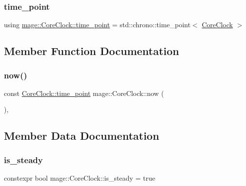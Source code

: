 \subsubsection{\texorpdfstring{time\+\_\+point}{time\_point}}
{\footnotesize\ttfamily using \hyperlink{structmage_1_1_core_clock_a1ea0193dea9647827d27469ec9e3b61c}{mage\+::\+Core\+Clock\+::time\+\_\+point} =  std\+::chrono\+::time\+\_\+point$<$ \hyperlink{structmage_1_1_core_clock}{Core\+Clock} $>$}



\subsection{Member Function Documentation}
\hypertarget{structmage_1_1_core_clock_af363ca628c94c9229342b919f9541f7b}{}\label{structmage_1_1_core_clock_af363ca628c94c9229342b919f9541f7b} 
\subsubsection{\texorpdfstring{now()}{now()}}
{\footnotesize\ttfamily const \hyperlink{structmage_1_1_core_clock_a1ea0193dea9647827d27469ec9e3b61c}{Core\+Clock\+::time\+\_\+point} mage\+::\+Core\+Clock\+::now (\begin{DoxyParamCaption}{ }\end{DoxyParamCaption})\hspace{0.3cm}{\ttfamily [static]}, {\ttfamily [noexcept]}}



\subsection{Member Data Documentation}
\hypertarget{structmage_1_1_core_clock_ae6481fa7adddf1e9fefd45fba2e20516}{}\label{structmage_1_1_core_clock_ae6481fa7adddf1e9fefd45fba2e20516} 
\subsubsection{\texorpdfstring{is\+\_\+steady}{is\_steady}}
{\footnotesize\ttfamily constexpr bool mage\+::\+Core\+Clock\+::is\+\_\+steady = true\hspace{0.3cm}{\ttfamily [static]}}

